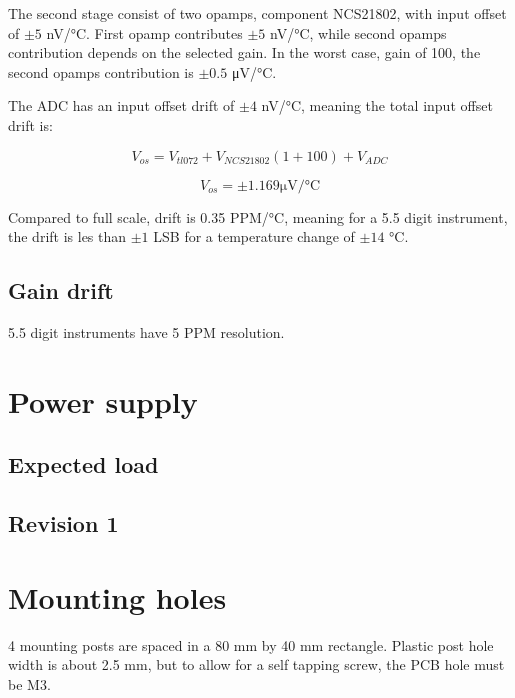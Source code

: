 \documentclass[11pt]{article}
\begin{document}
The second stage consist of two opamps, component NCS21802,
with input offset of $\pm 5$ \si{\nano \volt / \celsius}. First opamp
contributes $\pm 5$ \si{\nano \volt / \celsius}, while second opamps
contribution depends on the selected gain. In the worst case, gain of 
100, the second opamps contribution is $\pm 0.5$ \si{\micro \volt / \celsius}.

The ADC has an input offset drift of $\pm 4$ \si{\nano \volt / \celsius},
meaning the total input offset drift is: 

\begin{equation}
  V_{os} = V_{tl072} + V_{NCS21802} (1 + 100) + V_{ADC}
  \label{eq:offset_1}
\end{equation}

\begin{equation}
  V_{os} = \pm 1.169 \si{\micro \volt / \celsius}
  \label{eq:offset_2}
\end{equation}

Compared to full scale, drift is 0.35 \si{PPM/\celsius},
meaning for a 5.5 digit instrument, the drift is 
les than $\pm1$ LSB for a temperature change of
$\pm 14$ \si{\celsius}.

\subsection{Gain drift}
5.5 digit instruments have 5 PPM resolution.

\pagebreak
\section{Power supply}

\subsection{Expected load}
\subsection{Revision 1}



\section{Mounting holes}
4 mounting posts are spaced in a 80 mm by 40 mm rectangle. Plastic post 
hole width is about 2.5 mm, but to allow for a self tapping screw, the PCB 
hole must be M3.
\end{document}
